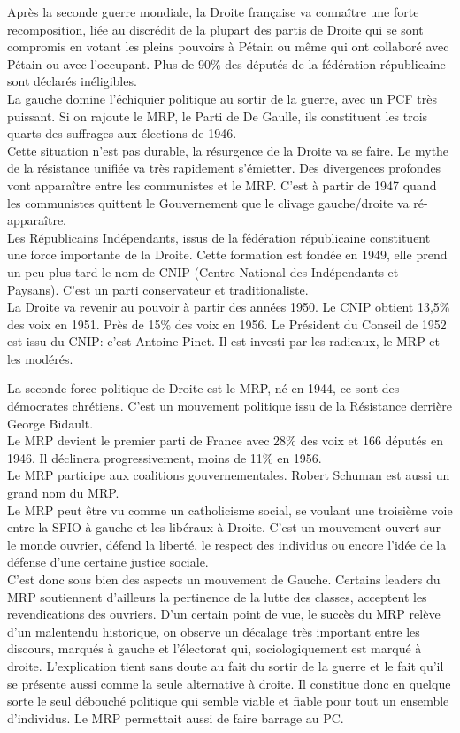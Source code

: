 \documentclass[10pt, a4paper, openany]{book}
\begin{document}
Après la seconde guerre mondiale, la Droite française va connaître une forte recomposition, liée au discrédit de la plupart des partis de Droite qui se sont compromis en votant les pleins pouvoirs à Pétain ou même qui ont collaboré avec Pétain ou avec l'occupant. Plus de 90\% des députés de la fédération républicaine sont déclarés inéligibles. \\
La gauche domine l'échiquier politique au sortir de la guerre, avec un PCF très puissant. Si on rajoute le MRP, le Parti de De Gaulle,  ils constituent les trois quarts des suffrages aux élections de 1946. \\
Cette situation n'est pas durable, la résurgence de la Droite va se faire. Le mythe de la résistance unifiée va très rapidement s'émietter. Des divergences profondes vont apparaître entre les communistes et le MRP. C'est à partir de 1947 quand les communistes quittent le Gouvernement que le clivage gauche/droite va ré-apparaître. \\
Les Républicains Indépendants, issus de la fédération républicaine constituent une force importante de la Droite. Cette formation est fondée en 1949, elle prend un peu plus tard le nom de CNIP (Centre National des Indépendants et Paysans). C'est un parti conservateur et traditionaliste.  \\
La Droite va revenir au pouvoir à partir des années 1950. Le CNIP obtient 13,5\% des voix en 1951. Près de 15\% des voix en 1956. Le Président du Conseil de 1952 est issu du CNIP: c'est Antoine Pinet. Il est investi par les radicaux, le MRP et les modérés.


La seconde force politique de Droite est le MRP, né en 1944, ce sont des démocrates chrétiens. C'est un mouvement politique issu de la Résistance derrière George Bidault. \\
Le MRP devient le premier parti de France avec 28\% des voix et 166 députés en 1946. Il déclinera progressivement, moins de 11\% en 1956. \\
Le MRP participe aux coalitions gouvernementales. Robert Schuman est aussi un grand nom du MRP. \\
Le MRP peut être vu comme un catholicisme social, se voulant une troisième voie entre la SFIO à gauche et les libéraux à Droite. C'est un mouvement ouvert sur le monde ouvrier, défend la liberté, le respect des individus ou encore l'idée de la défense d'une certaine justice sociale. \\
C'est donc sous bien des aspects un mouvement de Gauche. Certains leaders du MRP soutiennent d'ailleurs la pertinence de la lutte des classes, acceptent les revendications des ouvriers. D'un certain point de vue, le succès du MRP relève d'un malentendu historique, on observe un décalage très important entre les discours, marqués à gauche et l'électorat qui, sociologiquement est marqué à droite. L'explication tient sans doute au fait du sortir de la guerre et le fait qu'il se présente aussi comme la seule alternative à droite. Il constitue donc en quelque sorte le seul débouché politique qui semble viable et fiable pour tout un ensemble d'individus. Le MRP permettait aussi de faire barrage au PC.
\end{document}
